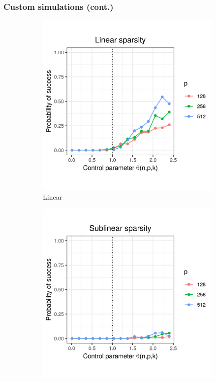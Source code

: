 \documentclass{beamer}
\begin{document}
\begin{frame}
\frametitle{Custom simulations (cont.)}

\begin{figure}[h]
  \centering
  \begin{subfigure}{0.32\textwidth}
    \includegraphics[width=0.9\linewidth]{uniform_linear_sparsity_alpha_050}
    \caption{Linear}
  \end{subfigure}
  \begin{subfigure}{0.32\textwidth}
    \includegraphics[width=0.9\linewidth]{uniform_sublinear_sparsity_alpha_050}

\end{subfigure}
\end{figure}
\end{frame}
\end{document}
